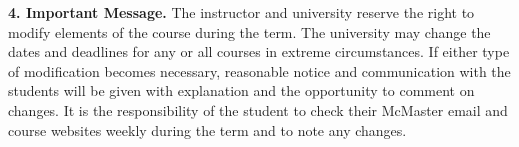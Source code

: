 \documentclass[10pt,oneside]{amsart}
\begin{document}
\noindent
{\bf 4. Important Message.}
The instructor and university reserve the right to modify elements of the 
course during the term.  The university may change the dates and deadlines 
for any or all courses in extreme circumstances.  If either type of 
modification becomes necessary, reasonable notice and communication with the 
students will be given with explanation and the opportunity to comment on 
changes.  It is the responsibility of the student to check their McMaster 
email and course websites weekly during the term and to note any changes.



\end{document}
